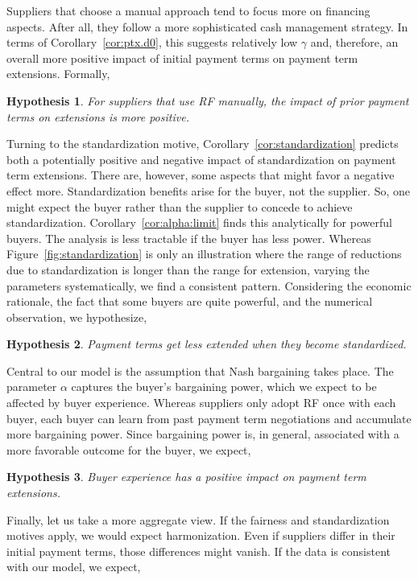 \documentclass[a4paper,11pt]{article}
\renewcommand{\~}[1]{\tilde{#1}}
\renewcommand{\-}[1]{\overline{#1}}
\newtheorem{hypothesis}{Hypothesis}
\newcounter{pretheorem}
\renewcommand\thehypothesis{\arabic{pretheorem}\alph{hypothesis}}
\newcommand{\theoremgroup}{\refstepcounter{pretheorem}}
\begin{document}
Suppliers that choose a manual approach tend to focus more on financing aspects. After all, they follow a more sophisticated cash management strategy. In terms of Corollary~\ref{cor:ptx.d0}, this suggests relatively low $\gamma$ and, therefore, an overall more positive impact of initial payment terms on payment term extensions. Formally,
\begin{hypothesis}\label{H:mode:interact}\singlespacing
For suppliers that use RF manually, the impact of prior payment terms on extensions is more positive.
\end{hypothesis}
Turning to the standardization motive, Corollary~\ref{cor:standardization} predicts both a potentially positive and negative impact of standardization on payment term extensions. There are, however, some aspects that might favor a negative effect more. Standardization benefits arise for the buyer, not the supplier. So, one might expect the buyer rather than the supplier to concede to achieve standardization. Corollary~\ref{cor:alpha:limit} finds this analytically for powerful buyers. The analysis is less tractable if the buyer has less power.  Whereas Figure~\ref{fig:standardization} is only an illustration where the range of reductions due to standardization is longer than the range for extension, varying the parameters systematically, we find a consistent pattern. Considering the economic rationale, the fact that some buyers are quite powerful, and the numerical observation, we hypothesize,
\theoremgroup
\renewcommand\thehypothesis{\arabic{pretheorem}}
\begin{hypothesis}\label{H:standardization}\singlespacing
Payment terms get less extended when they become standardized.
\end{hypothesis}
Central to our model is the assumption that Nash bargaining takes place. The parameter $\alpha$ captures the buyer's bargaining power, which we expect to be affected by buyer experience. Whereas suppliers only adopt RF once with each buyer, each buyer can learn from past payment term negotiations and accumulate more bargaining power. Since bargaining power is, in general, associated with a more favorable outcome for the buyer, we expect,
\theoremgroup
\begin{hypothesis}\label{H:experience}\singlespacing
Buyer experience has a positive impact on payment term extensions.
\end{hypothesis}
Finally, let us take a more aggregate view. If the fairness and standardization motives apply, we would expect harmonization. Even if suppliers differ in their initial payment terms, those differences might vanish. If the data is consistent with our model, we expect,
\end{document}
